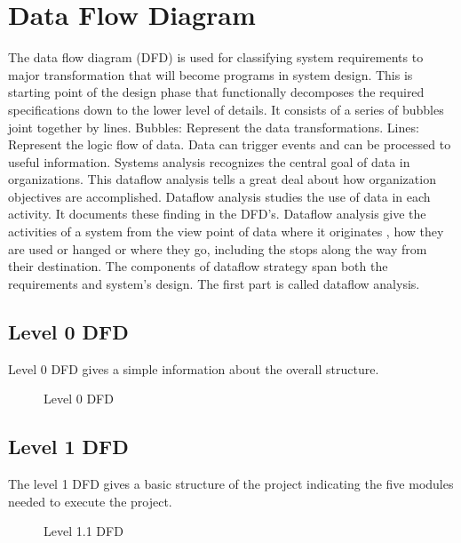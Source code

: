 \documentclass[12pt,a4paper,oneside]{report}
\begin{document}
\section{Data Flow Diagram}
The data flow diagram (DFD) is used for classifying system requirements to major transformation that will become programs in system design. This is starting point of the design phase that functionally decomposes the required specifications down to the lower level of details. It consists of a series of bubbles joint together by lines.
Bubbles: Represent the data transformations.
Lines: Represent the logic flow of data.
Data can trigger events and can be processed to useful information. Systems analysis recognizes the central goal of data in organizations. This dataflow analysis tells a great deal about how organization objectives are accomplished.
Dataflow analysis studies the use of data in each activity. It documents these finding in the DFD’s. Dataflow analysis give the activities of a system from the view point of data where it originates , how they are used or hanged or where they go, including the stops along the way from their destination. The components of dataflow strategy span both the requirements and system’s design. The first part is called dataflow analysis.


\subsection{Level 0 DFD}
Level 0 DFD gives a simple information about the overall structure. 
\begin{figure}[h!]
\begin{center}

\hspace{1 in}
\caption{Level 0 DFD}
\end{center}
\end{figure}

\subsection{Level 1 DFD}
The level 1 DFD gives a basic structure of the project indicating the five modules needed to execute the project.
\begin{figure}[h]
\begin{center}
\hspace{1 in}
\caption{Level 1.1 DFD}
\end{center}
\vspace{-1.5 in}
\end{figure}
\end{document}
